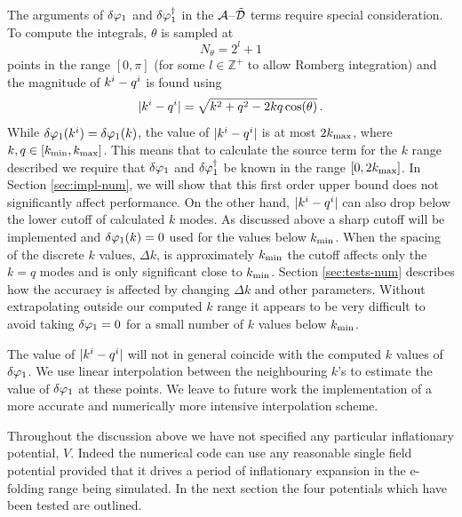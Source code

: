 The arguments of $\delta\varphi_{1}$ and $\delta\varphi_{1}^{\dagger}$ in the $\mathcal{A}$--$\tilde{\mathcal{D}}$ terms require
special consideration. 
To compute the integrals, $\theta$ is sampled at 
% 
\begin{equation}
\label{eq:nthetadefn}
N_\theta = 2^l + 1
\end{equation}
% 
points in the range
$[0,\pi]$ (for some $l\in \mathbb{Z}^+$ to allow Romberg integration) and the
magnitude of
$k^i-q^i$
is
found using
% 
\begin{equation}
 |k^i -q^i| = \sqrt{k^2 + q^2 - 2kq\cos(\theta)}\,.
\end{equation}
%
While $\delta\varphi_{1}(k^i)=\delta\varphi_{1}(k)$, the value of $|k^i-q^i|$ is at most
$2k_{\mathrm{max}}$, where $k,q \in [k_{\mathrm{min}},k_{\mathrm{max}}]$. This means that to calculate
the source term for the $k$ range described we require that $\delta\varphi_{1}$
and $\delta\varphi_{1}^{\dagger}$ be known in the range $[0, 2k_{\mathrm{max}}]$. In
Section \ref{sec:impl-num}, we will 
show that this first order upper bound does not significantly affect
performance. On the other hand, $|k^i-q^i|$ can also drop below the
lower cutoff of calculated $k$ modes. As discussed above a sharp cutoff will be
implemented and $\delta\varphi_{1}(k)=0$ used for the values below
$k_{\mathrm{min}}$. When the spacing of the discrete $k$ values, $\Delta k$,  is
approximately $k_{\mathrm{min}}$ the cutoff affects only the $k=q$ modes and
is only significant close to $k_{\mathrm{min}}$. 
Section \ref{sec:tests-num}
describes how the accuracy is affected by changing $\Delta k$ and
other parameters. Without extrapolating outside our computed $k$ range
it appears to be very difficult to avoid taking $\delta\varphi_{1}=0$ for a small number of
$k$ values below $k_{\mathrm{min}}$.


The value of $|k^i-q^i|$ will not in general coincide with the computed $k$
values of $\delta\varphi_{1}$. We use linear interpolation between the neighbouring $k$'s to
estimate the value of $\delta\varphi_{1}$ at these points. We leave to future work the
implementation of a more
accurate and numerically more intensive interpolation scheme.


Throughout the discussion above we have not specified any particular inflationary
potential, $V$. Indeed the numerical code can use any reasonable
single field potential provided that it drives a period of inflationary expansion in
the e-folding range being simulated. In the next section the four potentials which
have been tested are outlined. 

